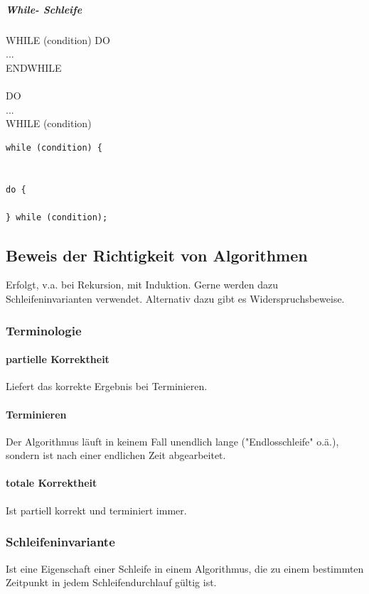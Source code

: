 \documentclass[fleqn]{scrartcl}
\begin{document}
\subparagraph{While- Schleife}
WHILE (condition) DO\\
\hspace*{2em} ... \\
ENDWHILE \\\\
DO \\
\hspace*{2em} ... \\
WHILE (condition)

\begin{lstlisting}
while (condition) {


do {

} while (condition);
\end{lstlisting}



\subsection{Beweis der Richtigkeit von Algorithmen}
Erfolgt, v.a. bei Rekursion, mit Induktion.
Gerne werden dazu Schleifeninvarianten verwendet.
Alternativ dazu gibt es Widerspruchsbeweise.

\subsubsection {Terminologie}
\paragraph{partielle Korrektheit} Liefert das korrekte Ergebnis bei Terminieren.
\paragraph{Terminieren} Der Algorithmus läuft in keinem Fall unendlich lange ("Endlosschleife" o.ä.), sondern ist nach einer endlichen Zeit abgearbeitet.
\paragraph{totale Korrektheit} Ist partiell korrekt und terminiert immer.

\subsubsection{Schleifeninvariante}
Ist eine Eigenschaft einer Schleife in einem Algorithmus, die zu einem bestimmten Zeitpunkt in jedem Schleifendurchlauf gültig ist.
\end{document}

